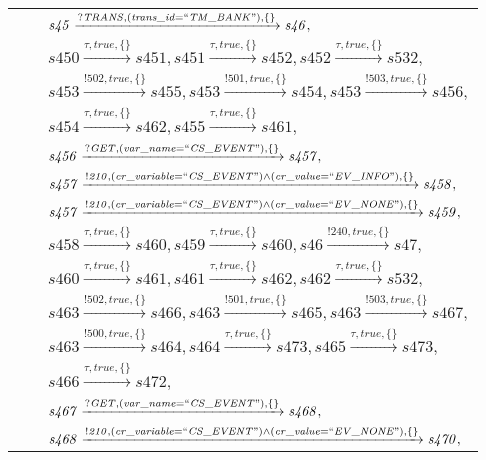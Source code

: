 \begin{tabular}{lcl}
& & $\mathit{s45}\xrightarrow{\mathit{?TRANS}, \mathit{(trans\_id = ``TM\_BANK")}, \{\}}\mathit{s46},$ \\
& & $\mathit{s450}\xrightarrow{\mathit{\tau}, \mathit{true}, \{\}}\mathit{s451},\mathit{s451}\xrightarrow{\mathit{\tau}, \mathit{true}, \{\}}\mathit{s452},\mathit{s452}\xrightarrow{\mathit{\tau}, \mathit{true}, \{\}}\mathit{s532},$ \\
& & $\mathit{s453}\xrightarrow{\mathit{!502}, \mathit{true}, \{\}}\mathit{s455},\mathit{s453}\xrightarrow{\mathit{!501}, \mathit{true}, \{\}}\mathit{s454},\mathit{s453}\xrightarrow{\mathit{!503}, \mathit{true}, \{\}}\mathit{s456},$ \\
& & $\mathit{s454}\xrightarrow{\mathit{\tau}, \mathit{true}, \{\}}\mathit{s462},\mathit{s455}\xrightarrow{\mathit{\tau}, \mathit{true}, \{\}}\mathit{s461},$ \\
& & $\mathit{s456}\xrightarrow{\mathit{?GET}, \mathit{(var\_name = ``CS\_EVENT")}, \{\}}\mathit{s457},$ \\
& & $\mathit{s457}\xrightarrow{\mathit{!210}, \mathit{(cr\_variable = ``CS\_EVENT") \land (cr\_value = ``EV\_INFO")}, \{\}}\mathit{s458},$ \\
& & $\mathit{s457}\xrightarrow{\mathit{!210}, \mathit{(cr\_variable = ``CS\_EVENT") \land (cr\_value = ``EV\_NONE")}, \{\}}\mathit{s459},$ \\
& & $\mathit{s458}\xrightarrow{\mathit{\tau}, \mathit{true}, \{\}}\mathit{s460},\mathit{s459}\xrightarrow{\mathit{\tau}, \mathit{true}, \{\}}\mathit{s460},\mathit{s46}\xrightarrow{\mathit{!240}, \mathit{true}, \{\}}\mathit{s47},$ \\
& & $\mathit{s460}\xrightarrow{\mathit{\tau}, \mathit{true}, \{\}}\mathit{s461},\mathit{s461}\xrightarrow{\mathit{\tau}, \mathit{true}, \{\}}\mathit{s462},\mathit{s462}\xrightarrow{\mathit{\tau}, \mathit{true}, \{\}}\mathit{s532},$ \\
& & $\mathit{s463}\xrightarrow{\mathit{!502}, \mathit{true}, \{\}}\mathit{s466},\mathit{s463}\xrightarrow{\mathit{!501}, \mathit{true}, \{\}}\mathit{s465},\mathit{s463}\xrightarrow{\mathit{!503}, \mathit{true}, \{\}}\mathit{s467},$ \\
& & $\mathit{s463}\xrightarrow{\mathit{!500}, \mathit{true}, \{\}}\mathit{s464},\mathit{s464}\xrightarrow{\mathit{\tau}, \mathit{true}, \{\}}\mathit{s473},\mathit{s465}\xrightarrow{\mathit{\tau}, \mathit{true}, \{\}}\mathit{s473},$ \\
& & $\mathit{s466}\xrightarrow{\mathit{\tau}, \mathit{true}, \{\}}\mathit{s472},$ \\
& & $\mathit{s467}\xrightarrow{\mathit{?GET}, \mathit{(var\_name = ``CS\_EVENT")}, \{\}}\mathit{s468},$ \\
& & $\mathit{s468}\xrightarrow{\mathit{!210}, \mathit{(cr\_variable = ``CS\_EVENT") \land (cr\_value = ``EV\_NONE")}, \{\}}\mathit{s470},$ \\
\end{tabular}

